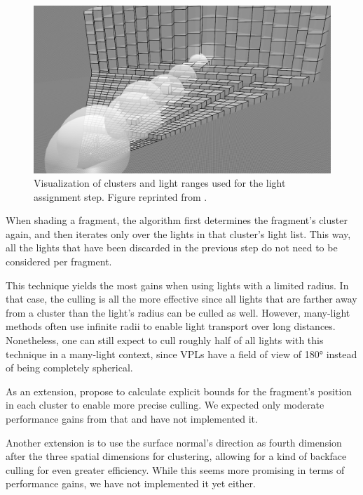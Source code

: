 \begin{figure}[htb]
\centering
    \includegraphics[width=\textwidth]{graphics/clustered_olsson}
  \caption{Visualization of clusters and light ranges used for the light assignment step. Figure reprinted from \citet{Olsson:2015:manylightmanagement}.}
  \label{fig:concept:clustered_olsson}
\end{figure}


When shading a fragment, the algorithm first determines the fragment's cluster again, and then iterates only over the lights in that cluster's light list. This way, all the lights that have been discarded in the previous step do not need to be considered per fragment.

This technique yields the most gains when using lights with a limited radius. In that case, the culling is all the more effective since all lights that are farther away from a cluster than the light's radius can be culled as well. However, many-light methods often use infinite radii to enable light transport over long distances. Nonetheless, one can still expect to cull roughly half of all lights with this technique in a many-light context, since VPLs have a field of view of 180° instead of being completely spherical.

As an extension, \citet{olsson2012clustered} propose to calculate explicit bounds for the fragment's position in each cluster to enable more precise culling. We expected only moderate performance gains from that and have not implemented it.

Another extension is to use the surface normal's direction as fourth dimension after the three spatial dimensions for clustering, allowing for a kind of backface culling for even greater efficiency. While this seems more promising in terms of performance gains, we have not implemented it yet either.


